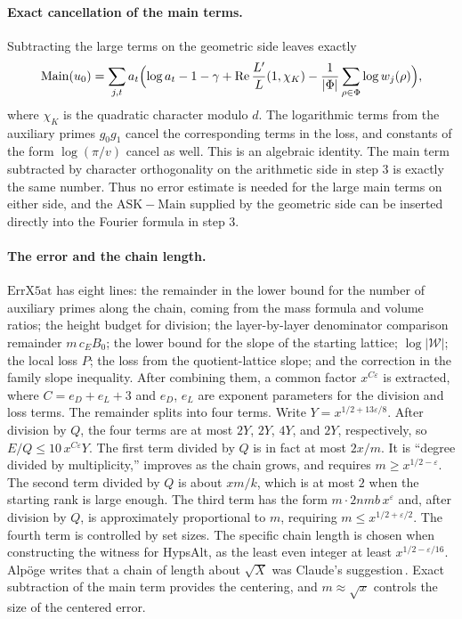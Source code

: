 \documentclass[11pt]{article}
\renewcommand{\Re}{\operatorname{Re}}
\begin{document}
\paragraph{Exact cancellation of the main terms.} Subtracting the large terms on the geometric side leaves exactly
\[
\mathrm{Main}(u_0)=\sum_{j,t}a_t\Bigl(\log a_t-1-\gamma+\Re\frac{L'}{L}(1,\chi_K)-\frac1{|\Phi|}\sum_{\rho\in\Phi}\log w_j(\rho)\Bigr),
\]
where $\chi_K$ is the quadratic character modulo $d$. The logarithmic terms from the auxiliary primes $g_0g_1$ cancel the corresponding terms in the loss, and constants of the form $\log(\pi/v)$ cancel as well. This is an algebraic identity. The main term subtracted by character orthogonality on the arithmetic side in step 3 is exactly the same number. Thus no error estimate is needed for the large main terms on either side, and the $\mathrm{ASK}-\mathrm{Main}$ supplied by the geometric side can be inserted directly into the Fourier formula in step 3.

\paragraph{The error and the chain length.} $\mathrm{ErrX5at}$ has eight lines: the remainder in the lower bound for the number of auxiliary primes along the chain, coming from the mass formula and volume ratios; the height budget for division; the layer-by-layer denominator comparison remainder $m\,c_EB_0$; the lower bound for the slope of the starting lattice; $\log|\mathcal W|$; the local loss $P$; the loss from the quotient-lattice slope; and the correction in the family slope inequality. After combining them, a common factor $x^{C\varepsilon}$ is extracted, where $C=e_D+e_L+3$ and $e_D$, $e_L$ are exponent parameters for the division and loss terms. The remainder splits into four terms. Write $Y=x^{1/2+13\varepsilon/8}$. After division by $Q$, the four terms are at most $2Y$, $2Y$, $4Y$, and $2Y$, respectively, so $E/Q\le10\,x^{C\varepsilon}Y$. The first term divided by $Q$ is in fact at most $2x/m$. It is ``degree divided by multiplicity,'' improves as the chain grows, and requires $m\ge x^{1/2-\varepsilon}$. The second term divided by $Q$ is about $xm/k$, which is at most $2$ when the starting rank is large enough. The third term has the form $m\cdot 2nmb\,x^{\varepsilon}$ and, after division by $Q$, is approximately proportional to $m$, requiring $m\le x^{1/2+\varepsilon/2}$. The fourth term is controlled by set sizes. The specific chain length is chosen when constructing the witness for \textsf{HypsAlt}, as the least even integer at least $x^{1/2-\varepsilon/16}$. Alpöge writes that a chain of length about $\sqrt X$ was Claude's suggestion\,\cite{alpoge}. Exact subtraction of the main term provides the centering, and $m\approx\sqrt x$ controls the size of the centered error.
\end{document}
